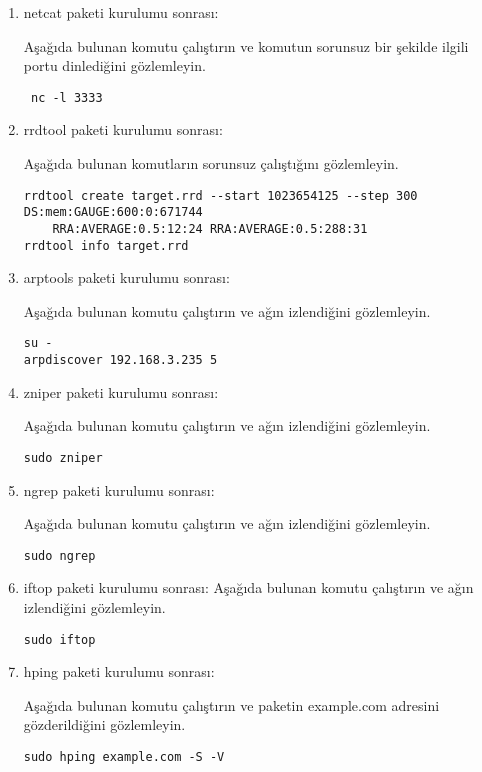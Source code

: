 \documentclass[a4paper,10pt]{article}
\begin{document}
\begin{enumerate}
\item netcat paketi kurulumu sonrası:

Aşağıda bulunan komutu çalıştırın ve komutun sorunsuz bir şekilde ilgili portu dinlediğini gözlemleyin.
\begin{verbatim}
 nc -l 3333 
\end{verbatim}

\item rrdtool paketi kurulumu sonrası:

Aşağıda bulunan komutların sorunsuz çalıştığını gözlemleyin.
\begin{verbatim}
rrdtool create target.rrd --start 1023654125 --step 300 DS:mem:GAUGE:600:0:671744  
	RRA:AVERAGE:0.5:12:24 RRA:AVERAGE:0.5:288:31 
rrdtool info target.rrd
\end{verbatim}


\item arptools paketi kurulumu sonrası:

Aşağıda bulunan komutu çalıştırın ve ağın izlendiğini gözlemleyin.
\begin{verbatim}
su -
arpdiscover 192.168.3.235 5
\end{verbatim}

\item zniper paketi kurulumu sonrası:

Aşağıda bulunan komutu çalıştırın ve ağın izlendiğini gözlemleyin.
\begin{verbatim}
sudo zniper
\end{verbatim}

\item ngrep paketi kurulumu sonrası:

Aşağıda bulunan komutu çalıştırın ve ağın izlendiğini gözlemleyin.
\begin{verbatim}
sudo ngrep
\end{verbatim}


\item iftop paketi kurulumu sonrası:
Aşağıda bulunan komutu çalıştırın ve ağın izlendiğini gözlemleyin.
\begin{verbatim}
sudo iftop 
\end{verbatim}

 \item hping paketi kurulumu sonrası:

Aşağıda bulunan komutu çalıştırın ve paketin example.com adresini gözderildiğini gözlemleyin.
\begin{verbatim}
sudo hping example.com -S -V 
\end{verbatim}


\end{enumerate}
\end{document}
